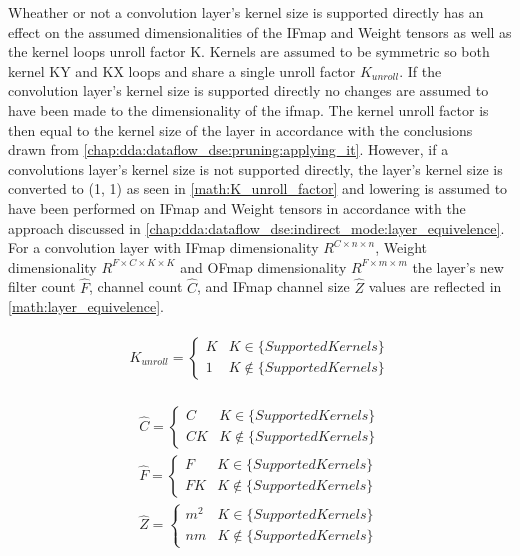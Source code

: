 Wheather or not a convolution layer's kernel size is supported directly has an effect on the assumed
dimensionalities of the IFmap and Weight tensors as well as the kernel loops
unroll factor K. Kernels are assumed to be symmetric so both kernel KY and KX
loops and share a single unroll factor $K_{unroll}$. If the convolution layer's
kernel size is supported directly no changes are assumed to have been made to
the dimensionality of the ifmap. The kernel unroll factor is then equal to the
kernel size of the layer in accordance with the conclusions drawn from
\autoref{chap:dda:dataflow_dse:pruning:applying_it}. However, if
a convolutions layer's kernel size is not supported directly, the layer's kernel
size is converted to (1, 1) as seen in \autoref{math:K_unroll_factor} and lowering
is assumed to have been performed on IFmap and Weight tensors in accordance with
the approach discussed in \autoref{chap:dda:dataflow_dse:indirect_mode:layer_equivelence}. For a convolution
layer with IFmap dimensionality $R^{C\times n\times n}$, Weight dimensionality
$R^{F\times C\times K\times K}$ and OFmap dimensionality $R^{F\times m\times m}$
the layer's new filter count $\hat{F}$, channel count $\hat{C}$, and IFmap
channel size $\hat{Z}$ values are reflected in \autoref{math:layer_equivelence}. 

\begin{align}
    \begin{gathered}
        K_{unroll} = \begin{cases} K & K \in \{SupportedKernels\}\\1 &K \notin \{SupportedKernels\}\end{cases}
            \end{gathered}
    \label{math:K_unroll_factor}
\end{align}

\begin{align}
    \begin{gathered}
        \hat{C} = \begin{cases} C &  K \in \{SupportedKernels\}\\ CK & K \notin \{SupportedKernels\}\end{cases} \\
        \hat{F} = \begin{cases} F &  K \in \{SupportedKernels\}\\ FK & K \notin \{SupportedKernels\}\end{cases} \\
        \hat{Z} = \begin{cases} m^2 &  K \in \{SupportedKernels\}\\ nm & K \notin \{SupportedKernels\}\end{cases}
            \end{gathered}
    \label{math:layer_equivelence}
\end{align}

